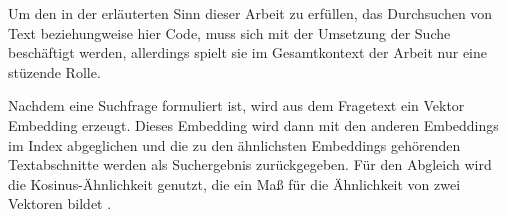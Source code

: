 \documentclass[../main.tex]{subfiles}
\begin{document}
Um den in der  erläuterten Sinn dieser Arbeit zu erfüllen, das Durchsuchen von Text beziehungweise hier Code, muss sich mit der Umsetzung der Suche beschäftigt werden, allerdings spielt sie im Gesamtkontext der Arbeit nur eine stüzende Rolle.

Nachdem eine Suchfrage formuliert ist, wird aus dem Fragetext ein Vektor Embedding erzeugt.
Dieses Embedding wird dann mit den anderen Embeddings im Index abgeglichen und die zu den ähnlichsten Embeddings gehörenden Textabschnitte werden als Suchergebnis zurückgegeben. 
Für den Abgleich wird die Kosinus-Ähnlichkeit genutzt, die ein Maß für die Ähnlichkeit von zwei Vektoren bildet \cite{rahutomo2012semantic}.
\end{document}
